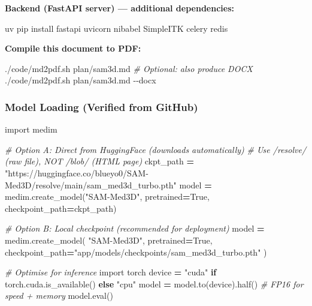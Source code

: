 \documentclass[
  11pt,
]{article}
\newenvironment{Shaded}{\begin{snugshade}}{\end{snugshade}}
\newcommand{\AttributeTok}[1]{\textcolor[rgb]{0.13,0.29,0.53}{#1}}
\newcommand{\BuiltInTok}[1]{#1}
\newcommand{\CommentTok}[1]{\textcolor[rgb]{0.56,0.35,0.01}{\textit{#1}}}
\newcommand{\ControlFlowTok}[1]{\textcolor[rgb]{0.13,0.29,0.53}{\textbf{#1}}}
\newcommand{\ExtensionTok}[1]{#1}
\newcommand{\ImportTok}[1]{#1}
\newcommand{\NormalTok}[1]{#1}
\newcommand{\OperatorTok}[1]{\textcolor[rgb]{0.81,0.36,0.00}{\textbf{#1}}}
\newcommand{\StringTok}[1]{\textcolor[rgb]{0.31,0.60,0.02}{#1}}
\newcommand{\VariableTok}[1]{\textcolor[rgb]{0.00,0.00,0.00}{#1}}
\begin{document}
\textbf{Backend (FastAPI server) --- additional dependencies:}

\begin{Shaded}
\begin{Highlighting}[]
\ExtensionTok{uv}\NormalTok{ pip install fastapi uvicorn nibabel SimpleITK celery redis}
\end{Highlighting}
\end{Shaded}

\textbf{Compile this document to PDF:}

\begin{Shaded}
\begin{Highlighting}[]
\ExtensionTok{./code/md2pdf.sh}\NormalTok{ plan/sam3d.md}
\CommentTok{\# Optional: also produce DOCX}
\ExtensionTok{./code/md2pdf.sh}\NormalTok{ plan/sam3d.md }\AttributeTok{{-}{-}docx}
\end{Highlighting}
\end{Shaded}

\subsubsection{Model Loading (Verified from
GitHub)}\label{model-loading-verified-from-github}

\begin{Shaded}
\begin{Highlighting}[]
\ImportTok{import}\NormalTok{ medim}

\CommentTok{\# Option A: Direct from HuggingFace (downloads automatically)}
\CommentTok{\# Use /resolve/ (raw file), NOT /blob/ (HTML page)}
\NormalTok{ckpt\_path }\OperatorTok{=} \StringTok{"https://huggingface.co/blueyo0/SAM{-}Med3D/resolve/main/sam\_med3d\_turbo.pth"}
\NormalTok{model }\OperatorTok{=}\NormalTok{ medim.create\_model(}\StringTok{"SAM{-}Med3D"}\NormalTok{, pretrained}\OperatorTok{=}\VariableTok{True}\NormalTok{, checkpoint\_path}\OperatorTok{=}\NormalTok{ckpt\_path)}

\CommentTok{\# Option B: Local checkpoint (recommended for deployment)}
\NormalTok{model }\OperatorTok{=}\NormalTok{ medim.create\_model(}
    \StringTok{"SAM{-}Med3D"}\NormalTok{,}
\NormalTok{    pretrained}\OperatorTok{=}\VariableTok{True}\NormalTok{,}
\NormalTok{    checkpoint\_path}\OperatorTok{=}\StringTok{"app/models/checkpoints/sam\_med3d\_turbo.pth"}
\NormalTok{)}

\CommentTok{\# Optimise for inference}
\ImportTok{import}\NormalTok{ torch}
\NormalTok{device }\OperatorTok{=} \StringTok{"cuda"} \ControlFlowTok{if}\NormalTok{ torch.cuda.is\_available() }\ControlFlowTok{else} \StringTok{"cpu"}
\NormalTok{model }\OperatorTok{=}\NormalTok{ model.to(device).half()  }\CommentTok{\# FP16 for speed + memory}
\NormalTok{model.}\BuiltInTok{eval}\NormalTok{()}
\end{Highlighting}
\end{Shaded}
\end{document}
